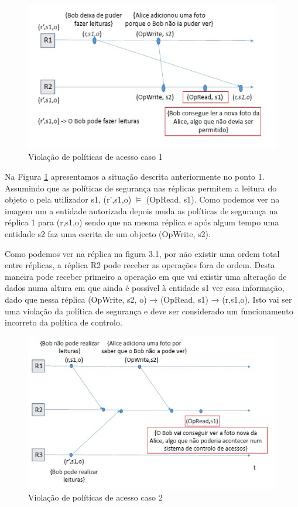 \documentclass[runningheads,a4paper]{llncs}
\begin{document}
\begin{figure}[h]
\centering
\includegraphics[scale=0.6]{Figure31}
\caption{Violação de políticas de acesso caso 1}
\label{fig:figure3.1}
\end{figure}

Na Figura \ref{fig:figure3.1} apresentamos a situação descrita anteriormente no ponto 1. Assumindo que as políticas de segurança nas réplicas permitem a leitura do objeto o pela utilizador s1, (r',s1,o) $\models$ (OpRead, s1). Como podemos ver na imagem um a entidade autorizada depois muda as políticas de segurança na réplica 1 para (r,s1,o) sendo que na mesma réplica e após algum tempo uma entidade s2 faz uma escrita de um objecto (OpWrite, s2).

Como podemos ver na réplica na figura 3.1, por não existir uma ordem total entre réplicas, a réplica R2 pode receber as operações fora de ordem. Desta maneira pode receber primeiro a operação em que vai existir uma alteração de dados numa altura em que ainda é possível à entidade s1 ver essa informação, dado que nessa réplica (OpWrite, s2, o) → (OpRead, s1) → (r,s1,o). Isto vai ser uma violação da política de segurança e deve ser considerado um funcionamento incorreto da política de controlo. 

\begin{figure}[h]
\centering
\includegraphics[scale=0.6]{Figure32}
\caption{Violação de políticas de acesso caso 2}
\label{fig:figure3.2}
\end{figure}
\end{document}
